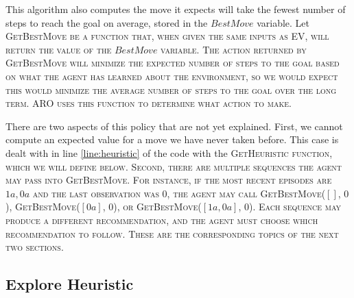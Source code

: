 \documentclass[letterpaper]{article} %
\begin{document}
This algorithm also computes the move it expects will take the fewest number of steps to reach the goal on average, stored in the $BestMove$ variable. Let \scshape GetBestMove \normalfont be a function that, when given the same inputs as \scshape EV\normalfont, will return the value of the $BestMove$ variable. The action returned by \scshape GetBestMove \normalfont will minimize the expected number of steps to the goal based on what the agent has learned about the environment, so we would expect this would minimize the average number of steps to the goal  over the long term. ARO uses this function to determine what action to make.

There are two aspects of this policy that are not yet
explained. First, we cannot compute an expected value for a move we
have never taken before. This case is dealt with in
line \ref{line:heuristic} of the code with the \scshape
GetHeuristic \normalfont function, which we will define below. Second,
there are multiple sequences the agent may pass into \scshape
GetBestMove\normalfont. For instance, if the most recent episodes are
$1a,0a$ and the last observation was $0$, the agent may call \scshape
GetBestMove\normalfont($[]$, $0$), \scshape
GetBestMove\normalfont($[0a]$, $0$), or \scshape
GetBestMove\normalfont($[1a, 0a]$, $0$). Each sequence may produce a
different recommendation, and the agent must choose which
recommendation to follow. These are the corresponding topics of the
next two sections.

\subsection{Explore Heuristic}
\end{document}
